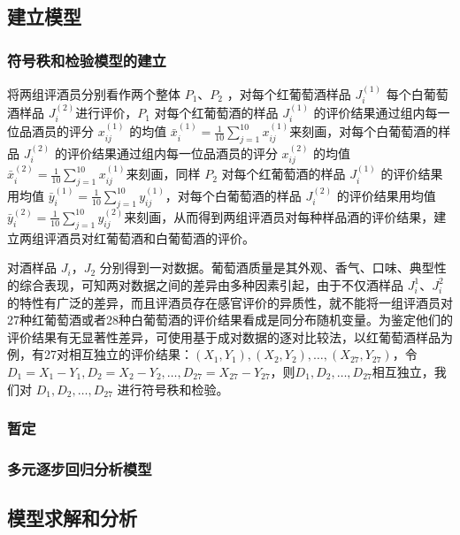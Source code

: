 \documentclass{cumcmart}
\begin{document}
    \subsection{建立模型}

        \subsubsection{符号秩和检验模型的建立}
    将两组评酒员分别看作两个整体 ${P_1}$、${P_2}$ ，对每个红葡萄酒样品 ${J_{i}^{(1)}}$ 每个白葡萄酒样品 ${J_{i}^{(2)}}$进行评价，${P_1}$ 对每个红葡萄酒的样品 ${J_{i}^{(1)}}$ 的评价结果通过组内每一位品酒员的评分 ${x_{ij}^{(1)}}$ 的均值 ${\bar{x}_{i}^{(1)}} = \frac{1}{10}\sum\limits_{j=1}^{10}x_{ij}^{(1)}$来刻画，对每个白葡萄酒的样品 ${J_{i}^{(2)}}$ 的评价结果通过组内每一位品酒员的评分 ${x_{ij}^{(2)}}$ 的均值 ${\bar{x}_{i}^{(2)}} = \frac{1}{10}\sum\limits_{j=1}^{10}x_{ij}^{(1)}$来刻画，同样 ${P_2}$ 对每个红葡萄酒的样品 ${J_{i}^{(1)}}$ 的评价结果用均值 ${\bar{y}_{i}^{(1)}} = \frac{1}{10}\sum\limits_{j=1}^{10}y_{ij}^{(1)}$，对每个白葡萄酒的样品 ${J_{i}^{(2)}}$ 的评价结果用均值 ${\bar{y}_{i}^{(2)}} = \frac{1}{10}\sum\limits_{j=1}^{10}y_{ij}^{(2)}$来刻画，从而得到两组评酒员对每种样品酒的评价结果，建立两组评酒员对红葡萄酒和白葡萄酒的评价。

    对酒样品 ${J_i}$，${J_2}$ 分别得到一对数据。葡萄酒质量是其外观、香气、口味、典型性的综合表现\cite{1}，可知两对数据之间的差异由多种因素引起，由于不仅酒样品 ${J_{i}^{1}}$、${J_{i}^{2}}$ 的特性有广泛的差异，而且评酒员存在感官评价的异质性\cite{2}，就不能将一组评酒员对27种红葡萄酒或者28种白葡萄酒的评价结果看成是同分布随机变量。为鉴定他们的评价结果有无显著性差异，可使用基于成对数据的逐对比较法，以红葡萄酒样品为例，有27对相互独立的评价结果：${(X_1,Y_1),(X_2,Y_2),\ldots,(X_{27},Y_{27})}$，令${D_1 = X_1 - Y_1,D_2 = X_2 - Y_2,\ldots,D_{27} = X_{27} - Y_{27}}$，则${D_1,D_2,\ldots,D_{27}}$相互独立，我们对 ${D_1,D_2,\ldots,D_{27}}$ 进行符号秩和检验。


        \subsubsection{暂定}


        \subsubsection{多元逐步回归分析模型}




    \subsection{模型求解和分析}
\end{document}
